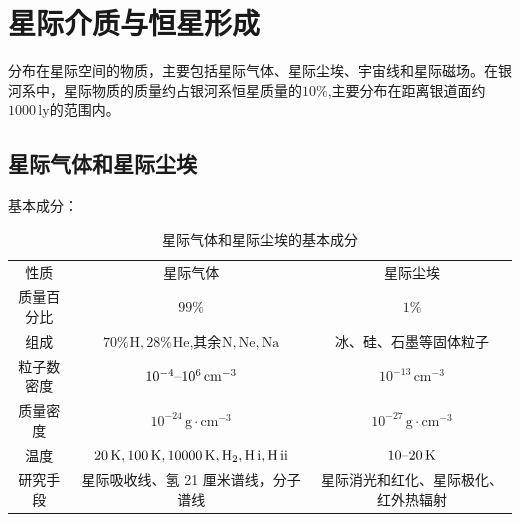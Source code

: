 \documentclass[../天体物理基础.tex]{subfiles}
\begin{document}
\section{星际介质与恒星形成}
分布在星际空间的物质，主要包括星际气体、星际尘埃、宇宙线和星际磁场。在银河系中，星际物质的质量约占银河系恒星质量的$10\%$,主要分布在距离银道面约$1000\,\mathrm{ly}$的范围内。

\subsection{星际气体和星际尘埃}
基本成分：
\begin{table}[!htbp]
\centering
\caption{星际气体和星际尘埃的基本成分}
\begin{tabular}{c c c}
\hline
性质 & 星际气体 & 星际尘埃\\
\cline{1-3}
质量百分比 & $99\%$ & $1\%$\\
\cline{1-3}
组成 & $70\%{}^{}\mathrm{H},28\%{}^{}\mathrm{He}$,其余${}^{}\mathrm{N,Ne,Na}$ & 冰、硅、石墨等固体粒子\\
\cline{1-3}
粒子数密度 & $10^{-4}\text{\textendash}10^{6}\,\mathrm{cm^{-3}}$ & $10^{-13}\,\mathrm{cm^{-3}}$\\
\cline{1-3}
质量密度 & $10^{-24}\,\mathrm{g\cdot cm^{-3}}$ & $10^{-27}\,\mathrm{g\cdot cm^{-3}}$\\
\cline{1-3}
温度 & $20\,\mathrm{K},100\,\mathrm{K},10000\,\mathrm{K},\mathrm{H}_{2},\mathrm{H\,\uppercase\expandafter{\romannumeral1}},\mathrm{H\,\uppercase\expandafter{\romannumeral2}}$ & $10\text{\textendash}20\,\mathrm{K}$\\
\cline{1-3}
研究手段 & 星际吸收线、氢 21 厘米谱线，分子谱线 & 星际消光和红化、星际极化、红外热辐射\\
\hline
\end{tabular}
\label{}
\end{table}
\end{document}
